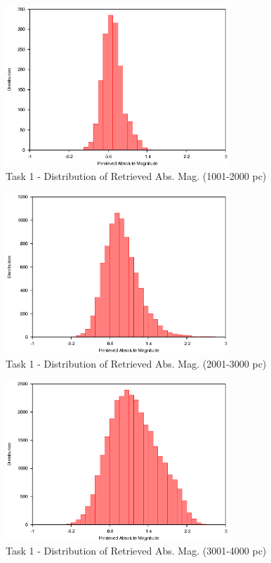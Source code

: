 \documentclass[a4paper,12pt]{article}
\begin{document}
\begin{figure}[H]
\centering
\includegraphics[width=0.75\textwidth]{./Task1/Bin2}
\caption{Task 1 - Distribution of Retrieved Abs. Mag. (1001-2000 pc)}
\label{fig:t1bin2}
\end{figure}

\begin{figure}[H]
\centering
\includegraphics[width=0.75\textwidth]{./Task1/Bin3}
\caption{Task 1 - Distribution of Retrieved Abs. Mag. (2001-3000 pc)}
\label{fig:t1bin3}
\end{figure}

\begin{figure}[H]
\centering
\includegraphics[width=0.75\textwidth]{./Task1/Bin4}
\caption{Task 1 - Distribution of Retrieved Abs. Mag. (3001-4000 pc)}
\label{fig:t1bin4}
\end{figure}
\end{document}
